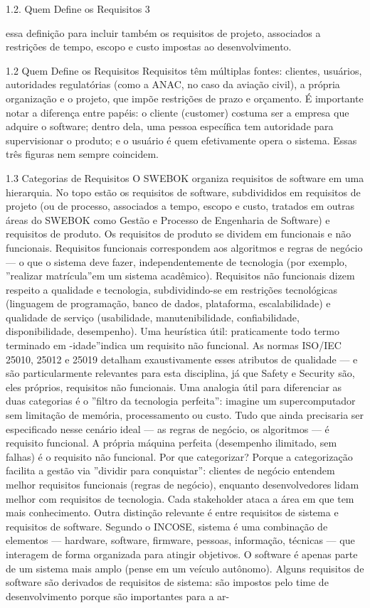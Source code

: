 1.2. Quem Define os Requisitos 3

essa definição para incluir também os requisitos de projeto, associados a restrições de tempo, escopo e custo impostas ao desenvolvimento.

1.2 Quem Define os Requisitos Requisitos têm múltiplas fontes: clientes, usuários, autoridades regulatórias (como a ANAC, no caso da aviação civil), a própria organização e o projeto, que impõe restrições de prazo e orçamento. É importante notar a diferença entre papéis: o cliente (customer) costuma ser a empresa que adquire o software; dentro dela, uma pessoa específica tem autoridade para supervisionar o produto; e o usuário é quem efetivamente opera o sistema. Essas três figuras nem sempre coincidem.

1.3 Categorias de Requisitos O SWEBOK organiza requisitos de software em uma hierarquia. No topo estão os requisitos de software, subdivididos em requisitos de projeto (ou de processo, associados a tempo, escopo e custo, tratados em outras áreas do SWEBOK como Gestão e Processo de Engenharia de Software) e requisitos de produto. Os requisitos de produto se dividem em funcionais e não funcionais. Requisitos funcionais correspondem aos algoritmos e regras de negócio — o que o sistema deve fazer, independentemente de tecnologia (por exemplo, ”realizar matrícula”em um sistema acadêmico). Requisitos não funcionais dizem respeito a qualidade e tecnologia, subdividindo-se em restrições tecnológicas (linguagem de programação, banco de dados, plataforma, escalabilidade) e qualidade de serviço (usabilidade, manutenibilidade, confiabilidade, disponibilidade, desempenho). Uma heurística útil: praticamente todo termo terminado em -idade”indica um requisito não funcional. As normas ISO/IEC 25010, 25012 e 25019 detalham exaustivamente esses atributos de qualidade — e são particularmente relevantes para esta disciplina, já que Safety e Security são, eles próprios, requisitos não funcionais. Uma analogia útil para diferenciar as duas categorias é o ”filtro da tecnologia perfeita”: imagine um supercomputador sem limitação de memória, processamento ou custo. Tudo que ainda precisaria ser especificado nesse cenário ideal — as regras de negócio, os algoritmos — é requisito funcional. A própria máquina perfeita (desempenho ilimitado, sem falhas) é o requisito não funcional. Por que categorizar? Porque a categorização facilita a gestão via ”dividir para conquistar”: clientes de negócio entendem melhor requisitos funcionais (regras de negócio), enquanto desenvolvedores lidam melhor com requisitos de tecnologia. Cada stakeholder ataca a área em que tem mais conhecimento. Outra distinção relevante é entre requisitos de sistema e requisitos de software. Segundo o INCOSE, sistema é uma combinação de elementos — hardware, software, firmware, pessoas, informação, técnicas — que interagem de forma organizada para atingir objetivos. O software é apenas parte de um sistema mais amplo (pense em um veículo autônomo). Alguns requisitos de software são derivados de requisitos de sistema: são impostos pelo time de desenvolvimento porque são importantes para a ar-

